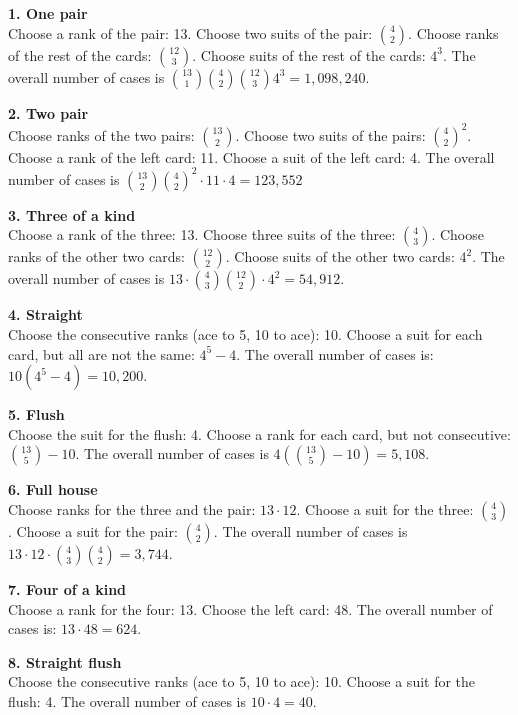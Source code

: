 \documentclass[../main.tex]{subfiles}
\begin{document}
\begin{sol}
    \noindent \textbf{1. One pair}\\
    \indent Choose a rank of the pair: 13.
    Choose two suits of the pair: $4 \choose 2$.
    Choose ranks of the rest of the cards: $12 \choose 3$.
    Choose suits of the rest of the cards: $4^3$.
    The overall number of cases is ${13 \choose 1}{4 \choose 2}{12 \choose 3}4^3 = 1,098,240$.

    \noindent \textbf{2. Two pair}\\
    \indent Choose ranks of the two pairs: $13 \choose 2$.
    Choose two suits of the pairs: ${4 \choose 2}^2$.
    Choose a rank of the left card: 11.
    Choose a suit of the left card: 4.
    The overall number of cases is ${13 \choose 2}{4 \choose 2}^2 \cdot 11 \cdot 4 = 123,552$

    \noindent \textbf{3. Three of a kind}\\
    \indent Choose a rank of the three: 13.
    Choose three suits of the three: $4 \choose 3$.
    Choose ranks of the other two cards: $12 \choose 2$.
    Choose suits of the other two cards: $4^2$.
    The overall number of cases is $13 \cdot {4 \choose 3} {12 \choose 2} \cdot 4^2 = 54,912$.

    \noindent \textbf{4. Straight}\\
    \indent Choose the consecutive ranks (ace to 5, 10 to ace): 10.
    Choose a suit for each card, but all are not the same: $4^5 - 4$.
    The overall number of cases is: $10(4^5 - 4) = 10,200$.

    \noindent \textbf{5. Flush}\\
    \indent Choose the suit for the flush: 4.
    Choose a rank for each card, but not consecutive: ${13 \choose 5} - 10$.
    The overall number of cases is $4 \left({13 \choose 5} - 10\right) = 5,108$.

    \noindent \textbf{6. Full house}\\
    \indent Choose ranks for the three and the pair: $13 \cdot 12$.
    Choose a suit for the three: $4 \choose 3$.
    Choose a suit for the pair: $4 \choose 2$.
    The overall number of cases is $13 \cdot 12 \cdot {4 \choose 3}{4 \choose 2} = 3,744$.

    \noindent \textbf{7. Four of a kind}\\
    \indent Choose a rank for the four: 13.
    Choose the left card: 48.
    The overall number of cases is: $13 \cdot 48 = 624$.

    \noindent \textbf{8. Straight flush}\\
    \indent Choose the consecutive ranks (ace to 5, 10 to ace): 10.
    Choose a suit for the flush: 4.
    The overall number of cases is $10 \cdot 4 = 40$.
\end{sol}
\end{document}
